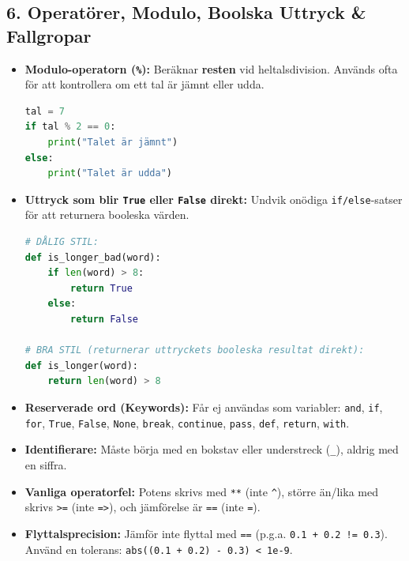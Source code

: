 \documentclass{article}
\begin{document}
\subsection*{6. Operatörer, Modulo, Boolska Uttryck \& Fallgropar}
\begin{itemize}
    \item \textbf{Modulo-operatorn (\texttt{\%}):} Beräknar \textbf{resten} vid heltalsdivision. Används ofta för att kontrollera om ett tal är jämnt eller udda.
\begin{lstlisting}[language=Python]
tal = 7
if tal % 2 == 0:
    print("Talet är jämnt")
else:
    print("Talet är udda")
\end{lstlisting}

    \item \textbf{Uttryck som blir \texttt{True} eller \texttt{False} direkt:} Undvik onödiga \texttt{if/else}-satser för att returnera booleska värden.
\begin{lstlisting}[language=Python]
# DÅLIG STIL:
def is_longer_bad(word):
    if len(word) > 8:
        return True
    else:
        return False

# BRA STIL (returnerar uttryckets booleska resultat direkt):
def is_longer(word):
    return len(word) > 8
\end{lstlisting}

    \item \textbf{Reserverade ord (Keywords):} Får ej användas som variabler: \texttt{and}, \texttt{if}, \texttt{for}, \texttt{True}, \texttt{False}, \texttt{None}, \texttt{break}, \texttt{continue}, \texttt{pass}, \texttt{def}, \texttt{return}, \texttt{with}.
    \item \textbf{Identifierare:} Måste börja med en bokstav eller understreck (\texttt{\_}), aldrig med en siffra.
    \item \textbf{Vanliga operatorfel:} Potens skrivs med \texttt{**} (inte \texttt{\^{}}), större än/lika med skrivs \texttt{>=} (inte \texttt{=>}), och jämförelse är \texttt{==} (inte \texttt{=}).
    \item \textbf{Flyttalsprecision:} Jämför inte flyttal med \texttt{==} (p.g.a. \texttt{0.1 + 0.2 != 0.3}). Använd en tolerans: \texttt{abs((0.1 + 0.2) - 0.3) < 1e-9}.
\end{itemize}
\end{document}
